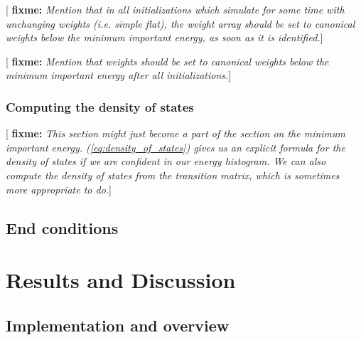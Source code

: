 \documentclass[11pt]{article}
\newcommand{\red}[1]{{\bf \color{red} #1}}
\newcommand{\fixme}[1]{[\red{fixme:} \emph{#1}]}
\begin{document}
\fixme{Mention that in all initializations which simulate for some
  time with unchanging weights (i.e. simple flat), the weight array
  should be set to canonical weights below the minimum important
  energy, as soon as it is identified.}

\fixme{Mention that weights should be set to canonical weights below
  the minimum important energy after all initializations.}

\subsubsection{Computing the density of states}
\label{sec:dos}

\fixme{This section might just become a part of the section on the
  minimum important energy. (\ref{eq:density_of_states}) gives us an
  explicit formula for the density of states if we are confident in
  our energy histogram. We can also compute the density of states from
  the transition matrix, which is sometimes more appropriate to do.}

\subsection{End conditions}
\label{sec:end_conditions}




\section{Results and Discussion}
\label{sec:results}

\subsection{Implementation and overview}
\label{sec:implementation}
\end{document}
